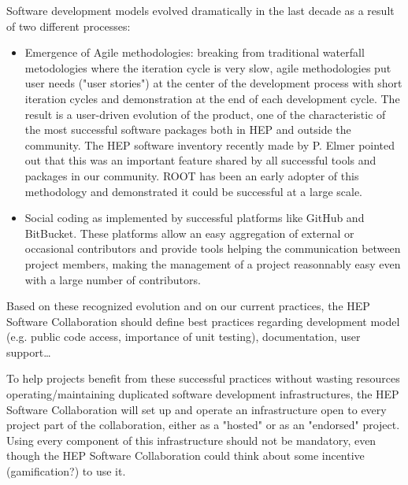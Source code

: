 \documentclass[11pt]{article} %
\begin{document}
Software development models evolved dramatically in the last decade as
a result of two different processes:

\begin{itemize}
\item 
Emergence of Agile methodologies: breaking from traditional
waterfall metodologies where the iteration cycle is very slow, agile
methodologies put user needs ("user stories") at the center of the
development process with short iteration cycles and demonstration
at the end of each development cycle.
The result is a user-driven evolution of the product, one of the
characteristic of the most successful software packages both in HEP
and outside the community. 
The HEP software inventory recently made by P. Elmer pointed out that
this was an important feature shared by all successful tools and
packages in our community.
ROOT has been an early adopter of this methodology and demonstrated
it could be successful at a large scale.

\item 
Social coding as implemented by successful platforms like GitHub and
BitBucket.
These platforms allow an easy aggregation of external or occasional
contributors and provide tools helping the communication between
project members, making the management of a project reasonnably
easy even with a large number of contributors.

\end{itemize}

Based on these recognized evolution and on our current practices, the HEP Software Collaboration should define
best practices regarding development model (e.g. public code access, importance of unit testing), documentation, user support\ldots

To help projects benefit from these successful practices without
wasting resources operating/maintaining duplicated software
development infrastructures, the HEP Software Collaboration will set
up and operate an infrastructure open to every project part of the
collaboration, either as a "hosted" or as an "endorsed" project. Using
every component of this infrastructure should not be mandatory, even
though the HEP Software Collaboration could think about some incentive
(gamification?) to use it.
\end{document}
